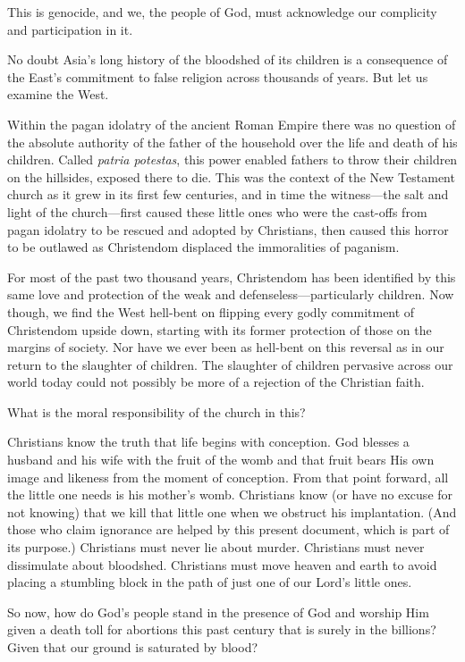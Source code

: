 \documentclass[
]{book}
\begin{document}
This is genocide, and we, the people of God, must acknowledge our complicity and participation in it.

No doubt Asia's long history of the bloodshed of its children is a consequence of the East's commitment to false religion across thousands of years. But let us examine the West.

Within the pagan idolatry of the ancient Roman Empire there was no question of the absolute authority of the father of the household over the life and death of his children. Called \emph{patria potestas}, this power enabled fathers to throw their children on the hillsides, exposed there to die. This was the context of the New Testament church as it grew in its first few centuries, and in time the witness---the salt and light of the church---first caused these little ones who were the cast-offs from pagan idolatry to be rescued and adopted by Christians, then caused this horror to be outlawed as Christendom displaced the immoralities of paganism.

For most of the past two thousand years, Christendom has been identified by this same love and protection of the weak and defenseless---particularly children. Now though, we find the West hell-bent on flipping every godly commitment of Christendom upside down, starting with its former protection of those on the margins of society. Nor have we ever been as hell-bent on this reversal as in our return to the slaughter of children. The slaughter of children pervasive across our world today could not possibly be more of a rejection of the Christian faith.

What is the moral responsibility of the church in this?

Christians know the truth that life begins with conception. God blesses a husband and his wife with the fruit of the womb and that fruit bears His own image and likeness from the moment of conception. From that point forward, all the little one needs is his mother's womb. Christians know (or have no excuse for not knowing) that we kill that little one when we obstruct his implantation. (And those who claim ignorance are helped by this present document, which is part of its purpose.) Christians must never lie about murder. Christians must never dissimulate about bloodshed. Christians must move heaven and earth to avoid placing a stumbling block in the path of just one of our Lord's little ones.

So now, how do God's people stand in the presence of God and worship Him given a death toll for abortions this past century that is surely in the billions? Given that our ground is saturated by blood?
\end{document}

